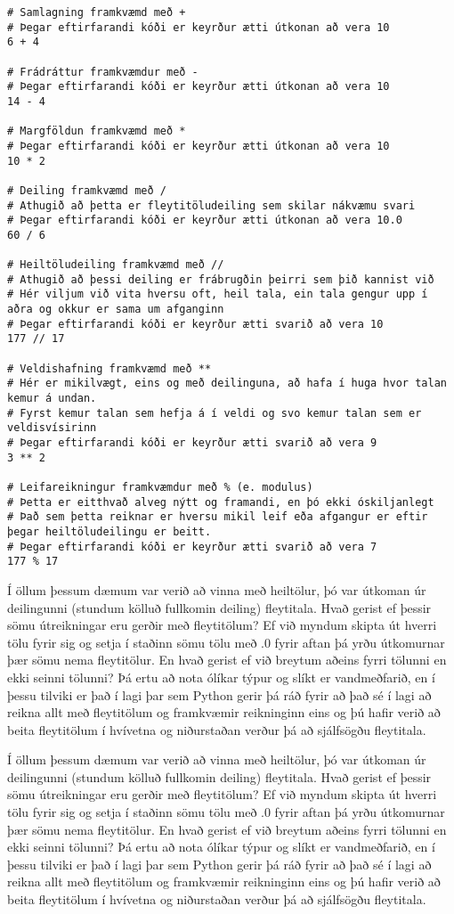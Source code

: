 \begin{lstlisting}[caption=Reikniaðgerðir, label=lst:reiknadg]
# Samlagning framkvæmd með + 
# Þegar eftirfarandi kóði er keyrður ætti útkonan að vera 10
6 + 4 

# Frádráttur framkvæmdur með -
# Þegar eftirfarandi kóði er keyrður ætti útkonan að vera 10
14 - 4 

# Margföldun framkvæmd með * 
# Þegar eftirfarandi kóði er keyrður ætti útkonan að vera 10
10 * 2 

# Deiling framkvæmd með / 
# Athugið að þetta er fleytitöludeiling sem skilar nákvæmu svari
# Þegar eftirfarandi kóði er keyrður ætti útkonan að vera 10.0
60 / 6 

# Heiltöludeiling framkvæmd með //
# Athugið að þessi deiling er frábrugðin þeirri sem þið kannist við
# Hér viljum við vita hversu oft, heil tala, ein tala gengur upp í aðra og okkur er sama um afganginn
# Þegar eftirfarandi kóði er keyrður ætti svarið að vera 10
177 // 17

# Veldishafning framkvæmd með **
# Hér er mikilvægt, eins og með deilinguna, að hafa í huga hvor talan kemur á undan.
# Fyrst kemur talan sem hefja á í veldi og svo kemur talan sem er veldisvísirinn
# Þegar eftirfarandi kóði er keyrður ætti svarið að vera 9
3 ** 2

# Leifareikningur framkvæmdur með % (e. modulus)
# Þetta er eitthvað alveg nýtt og framandi, en þó ekki óskiljanlegt
# Það sem þetta reiknar er hversu mikil leif eða afgangur er eftir þegar heiltöludeilingu er beitt.
# Þegar eftirfarandi kóði er keyrður ætti svarið að vera 7
177 % 17

\end{lstlisting}

\begin{valBox}
	Í öllum þessum dæmum var verið að vinna með heiltölur, þó var útkoman úr deilingunni (stundum kölluð fullkomin deiling) fleytitala. 
	Hvað gerist ef þessir sömu útreikningar eru gerðir með fleytitölum? 
	Ef við myndum skipta út hverri tölu fyrir sig og setja í staðinn sömu tölu með .0 fyrir aftan þá yrðu útkomurnar þær sömu nema fleytitölur. 
	En hvað gerist ef við breytum aðeins fyrri tölunni en ekki seinni tölunni?
	Þá ertu að nota ólíkar týpur og slíkt er vandmeðfarið, en í þessu tilviki er það í lagi þar sem Python gerir þá ráð fyrir að það sé í lagi að reikna allt með fleytitölum og framkvæmir reikninginn eins og þú hafir verið að beita fleytitölum í hvívetna og niðurstaðan verður þá að sjálfsögðu fleytitala.
\end{valBox}
Í öllum þessum dæmum var verið að vinna með heiltölur, þó var útkoman úr deilingunni (stundum kölluð fullkomin deiling) fleytitala. 
Hvað gerist ef þessir sömu útreikningar eru gerðir með fleytitölum? 
Ef við myndum skipta út hverri tölu fyrir sig og setja í staðinn sömu tölu með .0 fyrir aftan þá yrðu útkomurnar þær sömu nema fleytitölur. 
En hvað gerist ef við breytum aðeins fyrri tölunni en ekki seinni tölunni?
Þá ertu að nota ólíkar týpur og slíkt er vandmeðfarið, en í þessu tilviki er það í lagi þar sem Python gerir þá ráð fyrir að það sé í lagi að reikna allt með fleytitölum og framkvæmir reikninginn eins og þú hafir verið að beita fleytitölum í hvívetna og niðurstaðan verður þá að sjálfsögðu fleytitala.

